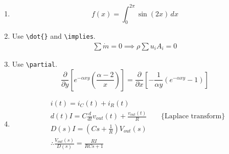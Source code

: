 \begin{enumerate}
\item
    \begin{equation*}
        f(x) = \int_{0}^{2\pi} \sin(2x) \,dx
    \end{equation*}
\item Use \verb|\dot{}| and \verb|\implies|.
    \begin{align*}
        \sum \dot{m} = 0 \implies \rho \sum u_i A_i = 0
    \end{align*}
\item Use \verb|\partial|.
    \begin{equation*}
        \frac{\partial}{\partial y} \left[
            e^{-\alpha xy} \left( \frac{\alpha - 2}{x} \right)
        \right]
        =
        \frac{\partial}{\partial x} \left[
            -\frac{1}{\alpha y} \left(
                e^{- \alpha xy} - 1
            \right)
        \right]
    \end{equation*}
\item 
    \begin{align*}
        & i(t) = i_C(t) + i_R(t) \\
        & d(t)I = C \frac{d}{dt}v_{out}(t) + \frac{v_{out}(t)}{R} \qquad \{\text{Laplace transform}\} \\
        & D(s)I = \left( Cs + \frac{1}{R} \right)V_{out}(s) \\
        & \therefore \frac{V_{out}(s)}{D(s)} = \frac{RI}{RCs+1}
    \end{align*}
\end{enumerate}
